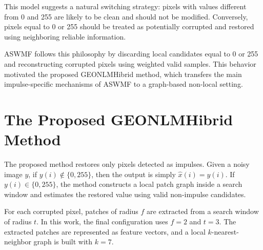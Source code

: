 \documentclass{ieeeaccess}
\begin{document}
This model suggests a natural switching strategy: pixels with values different from 0 and 255 are likely to be clean and should not be modified. Conversely, pixels equal to 0 or 255 should be treated as potentially corrupted and restored using neighboring reliable information.

ASWMF follows this philosophy by discarding local candidates equal to 0 or 255 and reconstructing corrupted pixels using weighted valid samples. This behavior motivated the proposed GEONLMHibrid method, which transfers the main impulse-specific mechanisms of ASWMF to a graph-based non-local setting.

\section{The Proposed GEONLMHibrid Method}
\label{sec:method}

The proposed method restores only pixels detected as impulses. Given a noisy image $y$, if $y(i) \notin \{0,255\}$, then the output is simply $\hat{x}(i)=y(i)$. If $y(i) \in \{0,255\}$, the method constructs a local patch graph inside a search window and estimates the restored value using valid non-impulse candidates.

For each corrupted pixel, patches of radius $f$ are extracted from a search window of radius $t$. In this work, the final configuration uses $f=2$ and $t=3$. The extracted patches are represented as feature vectors, and a local $k$-nearest-neighbor graph is built with $k=7$.
\end{document}
